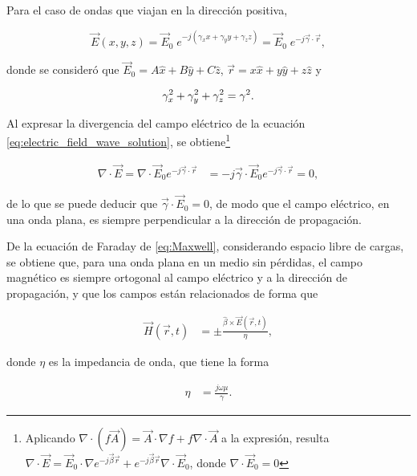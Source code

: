 Para el caso de ondas que viajan en la dirección positiva,

\begin{equation}
	\label{eq:electric_field_wave_solution}
	\vec{E}(x,y,z) = \vec{E}_0 \;e^{-j(\gamma_x x + \gamma_y y + \gamma_z z)} = \vec{E}_0 \;e^{-j\vec{\gamma}\cdot\vec{r}},
\end{equation}

donde se consideró que $\vec{E}_0 = A \hat{x} + B \hat{y} + C \hat{z}$, $\vec{r} = x \hat{x} + y \hat{y} + z \hat{z}$ y

\begin{equation}
\label{eq:numero_de_onda}
\gamma_x^2 + \gamma_y^2 + \gamma_z^2 = \gamma^2. \\
\end{equation}


Al expresar la divergencia del campo eléctrico de la ecuación \ref{eq:electric_field_wave_solution}, se obtiene\footnote{Aplicando $\nabla \cdot (f \vec{A}) = \vec{A} \cdot \nabla f + f \nabla \cdot \vec{A}$ a la expresión, resulta $\nabla \cdot \vec{E} = \vec{E}_0 \cdot \nabla e^{-j \vec{\beta} \vec{r}} + e^{-j \vec{\beta} \vec{r}}\nabla \cdot \vec{E}_0$, donde $\nabla \cdot \vec{E}_0 =0$}


\begin{align}
\nabla \cdot \vec{E} = \nabla \cdot \vec{E}_0 e^{-j\vec{\gamma} \cdot \vec{r}} & = -j \vec{\gamma} \cdot \vec{E}_0 e^{-j \vec{\gamma} \cdot \vec{r}} = 0,
\end{align}

de lo que se puede deducir que $\vec{\gamma} \cdot \vec{E}_0 = 0$, de modo que el campo eléctrico, en una onda plana, es siempre perpendicular a la dirección de propagación.

De la ecuación de Faraday de \ref{eq:Maxwell}, considerando espacio libre de cargas, se obtiene que, para una onda plana en un medio sin pérdidas, el campo magnético es siempre ortogonal al campo eléctrico y a la dirección de propagación, y que los campos están relacionados de forma que \cite{Fernandez:Electromag}

\begin{align}
	\label{eq:relacion-e-h-ondaplana}
	\vec{H}(\vec{r},t) &= \pm \frac{\hat{\beta} \times \vec{E}(\vec{r},t)}{\eta},
\end{align}

donde $\eta$ es la impedancia de onda, que tiene la forma

\begin{align}
	\eta &= \frac{j \omega \mu}{\gamma }.
\end{align}

